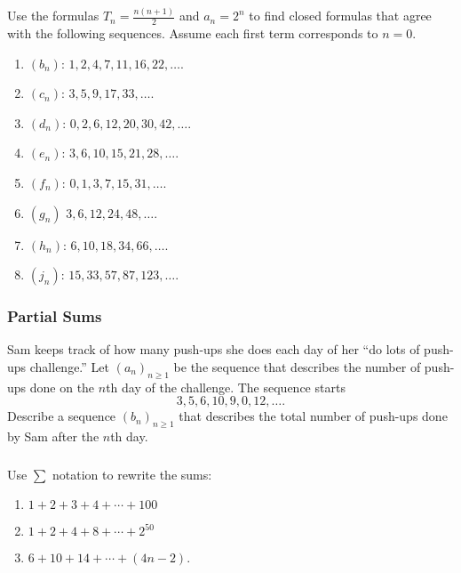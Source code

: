 \documentclass[11pt, compress]{beamer}
\begin{document}
\begin{frame}
\frametitle{}
\begin{example}[2.1.4]Use the formulas \(T_n = \frac{n(n+1)}{2}\) and \(a_n = 2^n\) to find closed formulas that agree with the following sequences.  Assume each first term corresponds to \(n=0\).\begin{enumerate}
\item{} \((b_n)\): \(1, 2, 4, 7, 11, 16, 22, \ldots \).


\item{} \((c_n)\): \(3, 5, 9, 17, 33,\ldots \).


\item{} \((d_n)\): \(0, 2, 6, 12, 20, 30, 42,\ldots \).


\item{} \((e_n)\): \(3, 6, 10, 15, 21, 28, \ldots\).


\item{} \((f_n)\): \(0, 1, 3, 7, 15, 31, \ldots \).


\item{} \((g_n)\) \(3, 6, 12, 24, 48, \ldots \).


\item{} \((h_n)\): \(6, 10, 18, 34, 66, \ldots \).


\item{} \((j_n)\): \(15, 33, 57, 87, 123, \ldots\).

\end{enumerate}

\end{example}
\end{frame}
 
\begin{frame}
\frametitle{Partial Sums}
 \begin{example}[2.1.5]Sam keeps track of how many push-ups she does each day of her ``do lots of push-ups challenge.''  Let \((a_n)_{n \ge 1}\) be the sequence that describes the number of push-ups done on the \(n\)th day of the challenge.  The sequence starts%
\begin{equation*}
3, 5, 6, 10, 9, 0, 12, \ldots\text{.}
\end{equation*}
Describe a sequence \((b_n)_{n \ge 1}\) that describes the total number of push-ups done by Sam after the \(n\)th day.
\end{example}
\end{frame}
 
\begin{frame}
\frametitle{}
\begin{example}[2.1.6]Use \(\sum\) notation to rewrite the sums:
\begin{enumerate}
\item{} \(\displaystyle 1 + 2 + 3 + 4 + \cdots + 100\)

\item{} \(\displaystyle 1 + 2 + 4 + 8 + \cdots + 2^{50}\)

\item{} \(6 + 10 + 14 + \cdots + (4n - 2)\).
\end{enumerate}

\end{example}
\end{frame}
 
\end{document}

